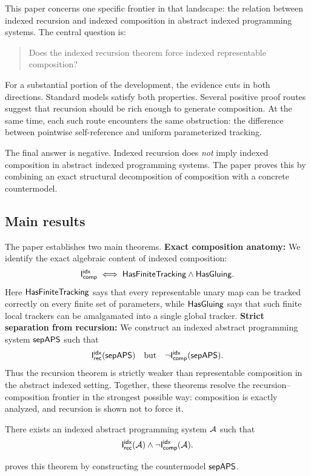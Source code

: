 \documentclass[11pt]{article}
\begin{document}
This paper concerns one specific frontier in that landscape: the relation between indexed recursion and indexed composition in abstract indexed programming systems.  The central question is:

\begin{quote}
Does the indexed recursion theorem force indexed representable composition?
\end{quote}

For a substantial portion of the development, the evidence cuts in both directions.  Standard models satisfy both properties.  Several positive proof routes suggest that recursion should be rich enough to generate composition.  At the same time, each such route encounters the same obstruction: the difference between pointwise self-reference and uniform parameterized tracking.

The final answer is negative.  Indexed recursion does \emph{not} imply indexed composition in abstract indexed programming systems.  The paper proves this by combining an exact structural decomposition of composition with a concrete countermodel.

\subsection{Main results}

The paper establishes two main theorems.  \textbf{Exact composition anatomy:} We identify the exact algebraic content of indexed composition:
\[
\mathsf{I}_{\mathsf{comp}}^{\mathsf{idx}} \;\Longleftrightarrow\; \mathsf{HasFiniteTracking} \wedge \mathsf{HasGluing}.
\]
Here \(\mathsf{HasFiniteTracking}\) says that every representable unary map can be tracked correctly on every finite set of parameters, while \(\mathsf{HasGluing}\) says that such finite local trackers can be amalgamated into a single global tracker.  \textbf{Strict separation from recursion:} We construct an indexed abstract programming system \(\mathsf{sepAPS}\) such that
\[
\mathsf{I}_{\mathsf{rec}}^{\mathsf{idx}}(\mathsf{sepAPS}) \quad\text{but}\quad \neg \mathsf{I}_{\mathsf{comp}}^{\mathsf{idx}}(\mathsf{sepAPS}).
\]
Thus the recursion theorem is strictly weaker than representable composition in the abstract indexed setting.  Together, these theorems resolve the recursion--composition frontier in the strongest possible way: composition is exactly analyzed, and recursion is shown not to force it.

\begin{theorem}\label{thm:main-separation}
There exists an indexed abstract programming system \(\mathcal{A}\) such that
\[
\mathsf{I}_{\mathsf{rec}}^{\mathsf{idx}}(\mathcal{A}) \wedge \neg \mathsf{I}_{\mathsf{comp}}^{\mathsf{idx}}(\mathcal{A}).
\]
\end{theorem}
 proves this theorem by constructing the countermodel \(\mathsf{sepAPS}\).
\end{document}
